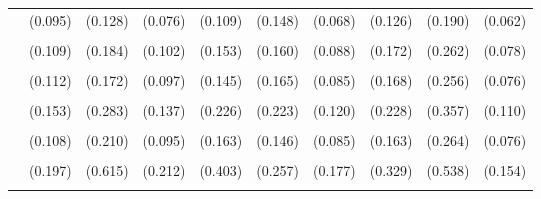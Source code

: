 \documentclass[3p, authoryear]{elsarticle} %
\begin{document}
\begin{landscape}
\begin{table}
{\begin{tabular}[t]{lccccccccc}
 & (0.095) & (0.128) & (0.076) & (0.109) & (0.148) & (0.068) & (0.126) & (0.190) & (0.062)\\
\cellcolor{gray!6}{Basketball} & \cellcolor{gray!6}{-0.011} & \cellcolor{gray!6}{-0.357*} & \cellcolor{gray!6}{-0.422***} & \cellcolor{gray!6}{-0.187} & \cellcolor{gray!6}{-0.109} & \cellcolor{gray!6}{-0.300***} & \cellcolor{gray!6}{-0.316*} & \cellcolor{gray!6}{-0.301} & \cellcolor{gray!6}{-0.215***}\\
 & (0.109) & (0.184) & (0.102) & (0.153) & (0.160) & (0.088) & (0.172) & (0.262) & (0.078)\\
\cellcolor{gray!6}{Baseball} & \cellcolor{gray!6}{0.130} & \cellcolor{gray!6}{0.192} & \cellcolor{gray!6}{-0.012} & \cellcolor{gray!6}{0.054} & \cellcolor{gray!6}{-0.108} & \cellcolor{gray!6}{0.139} & \cellcolor{gray!6}{0.127} & \cellcolor{gray!6}{-0.038} & \cellcolor{gray!6}{0.085}\\
 & (0.112) & (0.172) & (0.097) & (0.145) & (0.165) & (0.085) & (0.168) & (0.256) & (0.076)\\
\cellcolor{gray!6}{Football / Soccer} & \cellcolor{gray!6}{-0.479***} & \cellcolor{gray!6}{-1.068***} & \cellcolor{gray!6}{-0.359***} & \cellcolor{gray!6}{-0.886***} & \cellcolor{gray!6}{-0.263} & \cellcolor{gray!6}{-0.451***} & \cellcolor{gray!6}{-0.163} & \cellcolor{gray!6}{-0.964***} & \cellcolor{gray!6}{-0.538***}\\
 & (0.153) & (0.283) & (0.137) & (0.226) & (0.223) & (0.120) & (0.228) & (0.357) & (0.110)\\
\cellcolor{gray!6}{Tennis} & \cellcolor{gray!6}{0.386***} & \cellcolor{gray!6}{-0.535**} & \cellcolor{gray!6}{0.315***} & \cellcolor{gray!6}{-0.096} & \cellcolor{gray!6}{0.659***} & \cellcolor{gray!6}{0.201**} & \cellcolor{gray!6}{0.348**} & \cellcolor{gray!6}{-0.059} & \cellcolor{gray!6}{0.229***}\\
 & (0.108) & (0.210) & (0.095) & (0.163) & (0.146) & (0.085) & (0.163) & (0.264) & (0.076)\\
\cellcolor{gray!6}{Volleyball} & \cellcolor{gray!6}{0.703***} & \cellcolor{gray!6}{-0.077} & \cellcolor{gray!6}{0.452**} & \cellcolor{gray!6}{0.433} & \cellcolor{gray!6}{0.446*} & \cellcolor{gray!6}{0.593***} & \cellcolor{gray!6}{0.549*} & \cellcolor{gray!6}{0.424} & \cellcolor{gray!6}{0.610***}\\
 & (0.197) & (0.615) & (0.212) & (0.403) & (0.257) & (0.177) & (0.329) & (0.538) & (0.154)\\
\cellcolor{gray!6}{Other Sport} & \cellcolor{gray!6}{-0.051} & \cellcolor{gray!6}{-0.258} & \cellcolor{gray!6}{-0.212*} & \cellcolor{gray!6}{-0.495**} & \cellcolor{gray!6}{0.010} & \cellcolor{gray!6}{-0.133} & \cellcolor{gray!6}{0.268} & \cellcolor{gray!6}{-0.417} & \cellcolor{gray!6}{-0.223**}\\

\end{tabular}}
\end{table}
\end{landscape}
\end{document}
